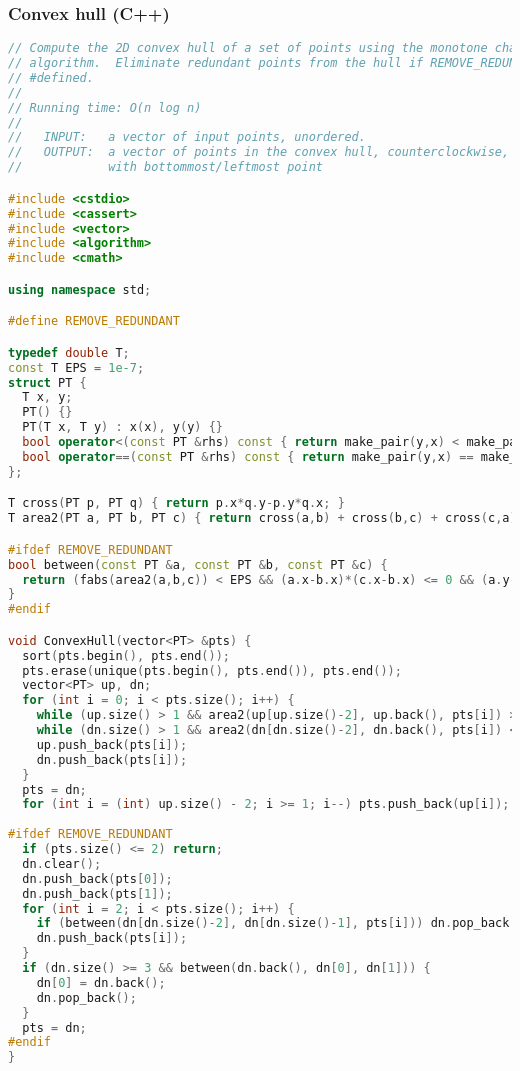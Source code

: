 \subsubsection{Convex hull (C++)}
\begin{lstlisting}[language=C++]
// Compute the 2D convex hull of a set of points using the monotone chain
// algorithm.  Eliminate redundant points from the hull if REMOVE_REDUNDANT is 
// #defined.
//
// Running time: O(n log n)
//
//   INPUT:   a vector of input points, unordered.
//   OUTPUT:  a vector of points in the convex hull, counterclockwise, starting
//            with bottommost/leftmost point

#include <cstdio>
#include <cassert>
#include <vector>
#include <algorithm>
#include <cmath>

using namespace std;

#define REMOVE_REDUNDANT

typedef double T;
const T EPS = 1e-7;
struct PT { 
  T x, y; 
  PT() {} 
  PT(T x, T y) : x(x), y(y) {}
  bool operator<(const PT &rhs) const { return make_pair(y,x) < make_pair(rhs.y,rhs.x); }
  bool operator==(const PT &rhs) const { return make_pair(y,x) == make_pair(rhs.y,rhs.x); }
};

T cross(PT p, PT q) { return p.x*q.y-p.y*q.x; }
T area2(PT a, PT b, PT c) { return cross(a,b) + cross(b,c) + cross(c,a); }

#ifdef REMOVE_REDUNDANT
bool between(const PT &a, const PT &b, const PT &c) {
  return (fabs(area2(a,b,c)) < EPS && (a.x-b.x)*(c.x-b.x) <= 0 && (a.y-b.y)*(c.y-b.y) <= 0);
}
#endif

void ConvexHull(vector<PT> &pts) {
  sort(pts.begin(), pts.end());
  pts.erase(unique(pts.begin(), pts.end()), pts.end());
  vector<PT> up, dn;
  for (int i = 0; i < pts.size(); i++) {
    while (up.size() > 1 && area2(up[up.size()-2], up.back(), pts[i]) >= 0) up.pop_back();
    while (dn.size() > 1 && area2(dn[dn.size()-2], dn.back(), pts[i]) <= 0) dn.pop_back();
    up.push_back(pts[i]);
    dn.push_back(pts[i]);
  }
  pts = dn;
  for (int i = (int) up.size() - 2; i >= 1; i--) pts.push_back(up[i]);
  
#ifdef REMOVE_REDUNDANT
  if (pts.size() <= 2) return;
  dn.clear();
  dn.push_back(pts[0]);
  dn.push_back(pts[1]);
  for (int i = 2; i < pts.size(); i++) {
    if (between(dn[dn.size()-2], dn[dn.size()-1], pts[i])) dn.pop_back();
    dn.push_back(pts[i]);
  }
  if (dn.size() >= 3 && between(dn.back(), dn[0], dn[1])) {
    dn[0] = dn.back();
    dn.pop_back();
  }
  pts = dn;
#endif
}

\end{lstlisting}
